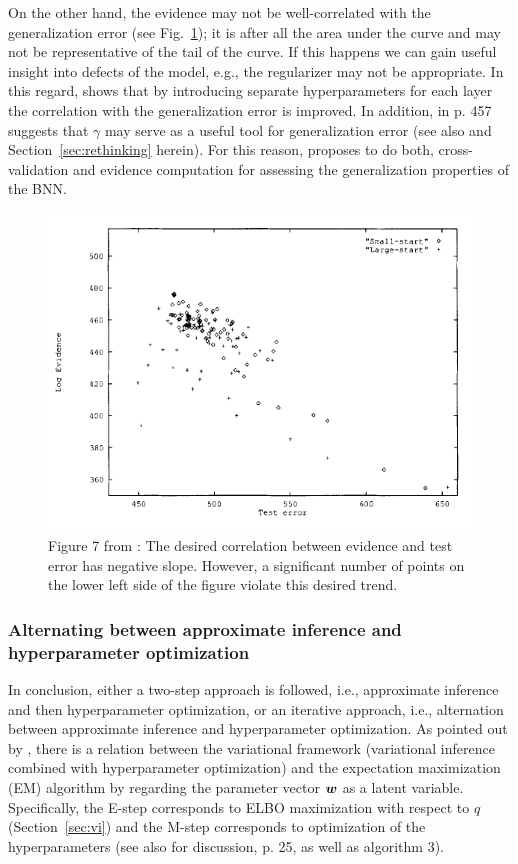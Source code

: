 On the other hand, the evidence may not be well-correlated with the generalization error (see Fig.~\ref{fig:evi_vs_error}); it is after all the area under the curve and may not be representative of the tail of the curve. 
If this happens we can gain useful insight into defects of the model, e.g., the regularizer may not be appropriate.
In this regard, \textcite{mackay1992practical} shows that by introducing separate hyperparameters for each layer the correlation with the generalization error is improved.
In addition, in p. 457 \textcite{mackay1992practical} suggests that $\gamma$ may serve as a useful tool for generalization error (see also \cite{maddox2020rethinking} and Section~\ref{sec:rethinking} herein).
For this reason, \textcite{mackay1992practical} proposes to do both, cross-validation and evidence computation for assessing the generalization properties of the BNN. 
\begin{figure}
	\centering
	\includegraphics[width=0.7\linewidth]{./Figures/evi_vs_error.png}
	\caption{Figure 7 from \textcite{mackay1992practical}: The desired correlation between evidence and test error has negative slope.
	However, a significant number of points on the lower left side of the figure violate this desired trend.}
	\label{fig:evi_vs_error}
\end{figure} 

\subsubsection{Alternating between approximate inference and hyperparameter optimization}\label{sec:alternation}

In conclusion, either a two-step approach is followed, i.e., approximate inference and then hyperparameter optimization, or an iterative approach, i.e., alternation between approximate inference and hyperparameter optimization. 
As pointed out by \textcite{neal1998view}, there is a relation between the variational framework (variational inference combined with hyperparameter optimization) and the expectation maximization (EM) algorithm by regarding the parameter vector $\boldsymbol{w}$ as a latent variable. 
Specifically, the E-step corresponds to ELBO maximization with respect to $q$ (Section~\ref{sec:vi}) and the M-step corresponds to optimization of the hyperparameters (see also \cite{barber1998ensemble} for discussion, \cite{gal2016uncertainty} p. 25, as well as \cite{jospin2020handson} algorithm 3). 

